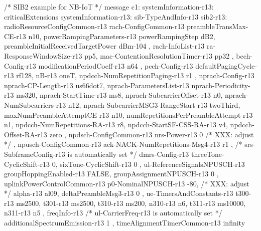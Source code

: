 /* SIB2 example for NB-IoT */
{
  message c1: systemInformation-r13: {
    criticalExtensions systemInformation-r13: {
      sib-TypeAndInfo-r13 {
        sib2-r13: {
          radioResourceConfigCommon-r13 {
            rach-ConfigCommon-r13 {
              preambleTransMax-CE-r13 n10,
              powerRampingParameters-r13 {
                powerRampingStep dB2,
                preambleInitialReceivedTargetPower dBm-104
              },
              rach-InfoList-r13 {
                {
                  ra-ResponseWindowSize-r13 pp5,
                  mac-ContentionResolutionTimer-r13 pp32
                }
              }
            },
            bcch-Config-r13 {
              modificationPeriodCoeff-r13 n64
            },
            pcch-Config-r13 {
              defaultPagingCycle-r13 rf128,
              nB-r13 oneT,
              npdcch-NumRepetitionPaging-r13 r1
            },
            nprach-Config-r13 {
              nprach-CP-Length-r13 us66dot7,
              nprach-ParametersList-r13 {
                {
                  nprach-Periodicity-r13 ms320,
                  nprach-StartTime-r13 ms8,
                  nprach-SubcarrierOffset-r13 n0,
                  nprach-NumSubcarriers-r13 n12,
                  nprach-SubcarrierMSG3-RangeStart-r13 twoThird,
                  maxNumPreambleAttemptCE-r13 n10,
                  numRepetitionsPerPreambleAttempt-r13 n1,
                  npdcch-NumRepetitions-RA-r13 r8,
                  npdcch-StartSF-CSS-RA-r13 v4,
                  npdcch-Offset-RA-r13 zero
                }
              }
            },
            npdsch-ConfigCommon-r13 {
              nrs-Power-r13 0 /* XXX: adjust */
            },
            npusch-ConfigCommon-r13 {
              ack-NACK-NumRepetitions-Msg4-r13 {
                r1
              },
              /* srs-SubframeConfig-r13 is automatically set */
              dmrs-Config-r13 {
                threeTone-CyclicShift-r13 0,
                sixTone-CyclicShift-r13 0
              },
              ul-ReferenceSignalsNPUSCH-r13 {
                groupHoppingEnabled-r13 FALSE,
                groupAssignmentNPUSCH-r13 0
              }
            },
            uplinkPowerControlCommon-r13 {
              p0-NominalNPUSCH-r13 -80, /* XXX: adjust */
              alpha-r13 al09,    
              deltaPreambleMsg3-r13 0 
            }
          },
          ue-TimersAndConstants-r13 {
            t300-r13 ms2500,
            t301-r13 ms2500,
            t310-r13 ms200,
            n310-r13 n6,
            t311-r13 ms10000,
            n311-r13 n5
          },
          freqInfo-r13 {
            /* ul-CarrierFreq-r13 is automatically set */
            additionalSpectrumEmission-r13 1
          },
          timeAlignmentTimerCommon-r13 infinity
        }
      }
    }
  }
}
